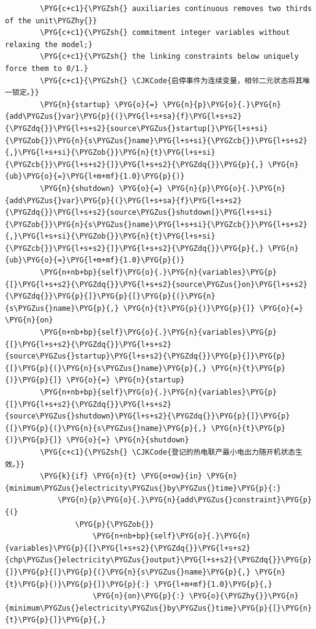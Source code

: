\begin{Verbatim}
        \PYG{c+c1}{\PYGZsh{} auxiliaries continuous removes two thirds of the unit\PYGZhy{}}
        \PYG{c+c1}{\PYGZsh{} commitment integer variables without relaxing the model;}
        \PYG{c+c1}{\PYGZsh{} the linking constraints below uniquely force them to 0/1.}
        \PYG{c+c1}{\PYGZsh{} \CJKCode{启停事件为连续变量，相邻二元状态将其唯一锁定。}}
        \PYG{n}{startup} \PYG{o}{=} \PYG{n}{p}\PYG{o}{.}\PYG{n}{add\PYGZus{}var}\PYG{p}{(}\PYG{l+s+sa}{f}\PYG{l+s+s2}{\PYGZdq{}}\PYG{l+s+s2}{source\PYGZus{}startup[}\PYG{l+s+si}{\PYGZob{}}\PYG{n}{s\PYGZus{}name}\PYG{l+s+si}{\PYGZcb{}}\PYG{l+s+s2}{,}\PYG{l+s+si}{\PYGZob{}}\PYG{n}{t}\PYG{l+s+si}{\PYGZcb{}}\PYG{l+s+s2}{]}\PYG{l+s+s2}{\PYGZdq{}}\PYG{p}{,} \PYG{n}{ub}\PYG{o}{=}\PYG{l+m+mf}{1.0}\PYG{p}{)}
        \PYG{n}{shutdown} \PYG{o}{=} \PYG{n}{p}\PYG{o}{.}\PYG{n}{add\PYGZus{}var}\PYG{p}{(}\PYG{l+s+sa}{f}\PYG{l+s+s2}{\PYGZdq{}}\PYG{l+s+s2}{source\PYGZus{}shutdown[}\PYG{l+s+si}{\PYGZob{}}\PYG{n}{s\PYGZus{}name}\PYG{l+s+si}{\PYGZcb{}}\PYG{l+s+s2}{,}\PYG{l+s+si}{\PYGZob{}}\PYG{n}{t}\PYG{l+s+si}{\PYGZcb{}}\PYG{l+s+s2}{]}\PYG{l+s+s2}{\PYGZdq{}}\PYG{p}{,} \PYG{n}{ub}\PYG{o}{=}\PYG{l+m+mf}{1.0}\PYG{p}{)}
        \PYG{n+nb+bp}{self}\PYG{o}{.}\PYG{n}{variables}\PYG{p}{[}\PYG{l+s+s2}{\PYGZdq{}}\PYG{l+s+s2}{source\PYGZus{}on}\PYG{l+s+s2}{\PYGZdq{}}\PYG{p}{]}\PYG{p}{[}\PYG{p}{(}\PYG{n}{s\PYGZus{}name}\PYG{p}{,} \PYG{n}{t}\PYG{p}{)}\PYG{p}{]} \PYG{o}{=} \PYG{n}{on}
        \PYG{n+nb+bp}{self}\PYG{o}{.}\PYG{n}{variables}\PYG{p}{[}\PYG{l+s+s2}{\PYGZdq{}}\PYG{l+s+s2}{source\PYGZus{}startup}\PYG{l+s+s2}{\PYGZdq{}}\PYG{p}{]}\PYG{p}{[}\PYG{p}{(}\PYG{n}{s\PYGZus{}name}\PYG{p}{,} \PYG{n}{t}\PYG{p}{)}\PYG{p}{]} \PYG{o}{=} \PYG{n}{startup}
        \PYG{n+nb+bp}{self}\PYG{o}{.}\PYG{n}{variables}\PYG{p}{[}\PYG{l+s+s2}{\PYGZdq{}}\PYG{l+s+s2}{source\PYGZus{}shutdown}\PYG{l+s+s2}{\PYGZdq{}}\PYG{p}{]}\PYG{p}{[}\PYG{p}{(}\PYG{n}{s\PYGZus{}name}\PYG{p}{,} \PYG{n}{t}\PYG{p}{)}\PYG{p}{]} \PYG{o}{=} \PYG{n}{shutdown}
        \PYG{c+c1}{\PYGZsh{} \CJKCode{登记的热电联产最小电出力随开机状态生效。}}
        \PYG{k}{if} \PYG{n}{t} \PYG{o+ow}{in} \PYG{n}{minimum\PYGZus{}electricity\PYGZus{}by\PYGZus{}time}\PYG{p}{:}
            \PYG{n}{p}\PYG{o}{.}\PYG{n}{add\PYGZus{}constraint}\PYG{p}{(}
                \PYG{p}{\PYGZob{}}
                    \PYG{n+nb+bp}{self}\PYG{o}{.}\PYG{n}{variables}\PYG{p}{[}\PYG{l+s+s2}{\PYGZdq{}}\PYG{l+s+s2}{chp\PYGZus{}electricity\PYGZus{}output}\PYG{l+s+s2}{\PYGZdq{}}\PYG{p}{]}\PYG{p}{[}\PYG{p}{(}\PYG{n}{s\PYGZus{}name}\PYG{p}{,} \PYG{n}{t}\PYG{p}{)}\PYG{p}{]}\PYG{p}{:} \PYG{l+m+mf}{1.0}\PYG{p}{,}
                    \PYG{n}{on}\PYG{p}{:} \PYG{o}{\PYGZhy{}}\PYG{n}{minimum\PYGZus{}electricity\PYGZus{}by\PYGZus{}time}\PYG{p}{[}\PYG{n}{t}\PYG{p}{]}\PYG{p}{,}

\end{Verbatim}
